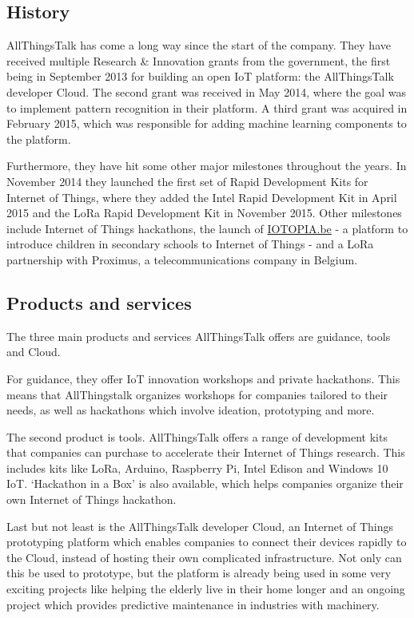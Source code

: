 \documentclass[pdftex,a4paper,12pt,twoside]{report}
\begin{document}
\subsection{History}
\label{subsec:atthistory}
AllThingsTalk has come a long way since the start of the company. They have received multiple Research \& Innovation grants from the government, the first being in September 2013 for building an open IoT platform: the AllThingsTalk developer Cloud. The second grant was received in May 2014, where the goal was to implement pattern recognition in their platform. A third grant was acquired in February 2015, which was responsible for adding machine learning components to the platform.

Furthermore, they have hit some other major milestones throughout the years. In November 2014 they launched the first set of Rapid Development Kits for Internet of Things, where they added the Intel Rapid Development Kit in April 2015 and the LoRa Rapid Development Kit in November 2015. Other milestones include Internet of Things hackathons, the launch of \url{IOTOPIA.be} - a platform to introduce children in secondary schools to Internet of Things - and a LoRa partnership with Proximus, a telecommunications company in Belgium.

\subsection{Products and services}
\label{subsec:attproductsservices}
The three main products and services AllThingsTalk offers are guidance, tools and Cloud. 

For guidance, they offer IoT innovation workshops and private hackathons. This means that AllThingstalk organizes workshops for companies tailored to their needs, as well as hackathons which involve ideation, prototyping and more.

The second product is tools. AllThingsTalk offers a range of development kits that companies can purchase to accelerate their Internet of Things research. This includes kits like LoRa, Arduino, Raspberry Pi, Intel Edison and Windows 10 IoT. `Hackathon in a Box' is also available, which helps companies organize their own Internet of Things hackathon.

Last but not least is the AllThingsTalk developer Cloud, an Internet of Things prototyping platform which enables companies to connect their devices rapidly to the Cloud, instead of hosting their own complicated infrastructure. Not only can this be used to prototype, but the platform is already being used in some very exciting projects like helping the elderly live in their home longer and an ongoing project which provides predictive maintenance in industries with machinery.
\end{document}
